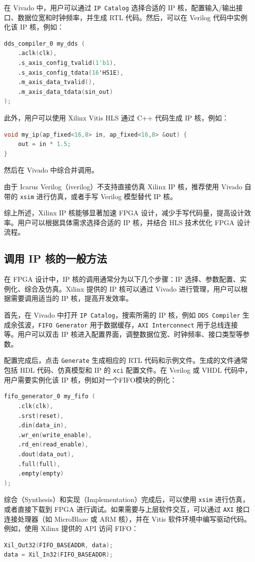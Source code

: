 在 Vivado 中，用户可以通过 \texttt{IP Catalog} 选择合适的 IP 核，配置输入/输出接口、数据位宽和时钟频率，并生成 RTL 代码。然后，可以在 Verilog 代码中实例化该 IP 核，例如：
\begin{lstlisting}[language=verilog]
dds_compiler_0 my_dds (
    .aclk(clk), 
    .s_axis_config_tvalid(1'b1),  
    .s_axis_config_tdata(16'H51E), 
    .m_axis_data_tvalid(),   
    .m_axis_data_tdata(sin_out) 
);
\end{lstlisting}

此外，用户可以使用 Xilinx Vitis HLS 通过 C++ 代码生成 IP 核，例如：
\begin{lstlisting}[language=C++]
void my_ip(ap_fixed<16,8> in, ap_fixed<16,8> &out) {
    out = in * 1.5;
}
\end{lstlisting}
然后在 Vivado 中综合并调用。

由于 Icarus Verilog（iverilog）不支持直接仿真 Xilinx IP 核，推荐使用 Vivado 自带的 \texttt{xsim} 进行仿真，或者手写 Verilog 模型替代 IP 核。

综上所述，Xilinx IP 核能够显著加速 FPGA 设计，减少手写代码量，提高设计效率。用户可以根据具体需求选择合适的 IP 核，并结合 HLS 技术优化 FPGA 设计流程。
\subsection{调用 IP 核的一般方法}

在 FPGA 设计中，IP 核的调用通常分为以下几个步骤：IP 选择、参数配置、实例化、综合及仿真。Xilinx 提供的 IP 核可以通过 Vivado 进行管理，用户可以根据需要调用适当的 IP 核，提高开发效率。

首先，在 Vivado 中打开 \texttt{IP Catalog}，搜索所需的 IP 核，例如 \texttt{DDS Compiler} 生成余弦波，\texttt{FIFO Generator} 用于数据缓存，\texttt{AXI Interconnect} 用于总线连接等。用户可以双击 IP 核进入配置界面，调整数据位宽、时钟频率、接口类型等参数。

配置完成后，点击 \texttt{Generate} 生成相应的 RTL 代码和示例文件。生成的文件通常包括 HDL 代码、仿真模型和 IP 的 \texttt{xci} 配置文件。在 Verilog 或 VHDL 代码中，用户需要实例化该 IP 核，例如对一个FIFO模块的例化：
\begin{lstlisting}[language=verilog]
fifo_generator_0 my_fifo (
    .clk(clk),
    .srst(reset),
    .din(data_in),
    .wr_en(write_enable),
    .rd_en(read_enable),
    .dout(data_out),
    .full(full),
    .empty(empty)
);
\end{lstlisting}

综合（Synthesis）和实现（Implementation）完成后，可以使用 \texttt{xsim} 进行仿真，或者直接下载到 FPGA 进行调试。如果需要与上层软件交互，可以通过 \texttt{AXI} 接口连接处理器（如 MicroBlaze 或 ARM 核），并在 Vitis 软件环境中编写驱动代码。例如，使用 Xilinx 提供的 API 访问 FIFO：
\begin{lstlisting}[language=C++]
Xil_Out32(FIFO_BASEADDR, data);
data = Xil_In32(FIFO_BASEADDR);
\end{lstlisting}


